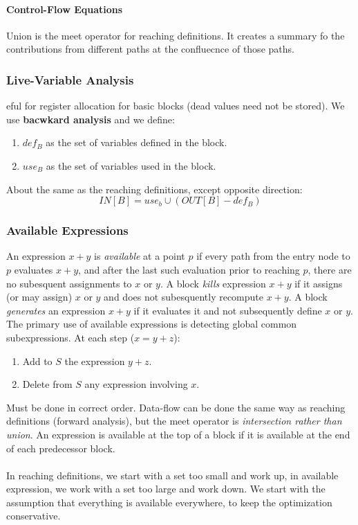 \documentclass{article}
\begin{document}
\paragraph{Control-Flow Equations} %
\label{par:Control-Flow Equations}
Union is the meet operator for reaching definitions. It creates a summary fo the contributions from different paths at the confluecnce of those paths.


\subsubsection{Live-Variable Analysis} %
\label{ssub:Live-Variable Analysis}
eful for register allocation for basic blocks (dead values need not be stored). We use \textbf{bacwkard analysis} and we define:
\begin{enumerate}
	\item $def_B$ as the set of variables defined in the block.
	\item $use_B$ as the set of variables used in the block.
\end{enumerate}
About the same as the reaching definitions, except opposite direction:
\begin{equation}
	IN[B] = use_b \cup (OUT[B] - def_B)
\end{equation}

\subsubsection{Available Expressions} %
\label{ssub:Availabel Expressions}
An expression $x + y$ is \emph{available} at a point $p$ if every path from the entry node to $p$ evaluates $x + y$, and after the last such evaluation prior to reaching $p$, there are no subesquent assignments to $x$ or $y$. A block \emph{kills} expression $x + y$ if it assigns (or may assign) $x$ or $y$ and does not subesquently recompute $x + y$. A block \emph{generates} an expression $x + y$ if it evaluates it and not subsequently define $x$ or $y$. The primary use of available expressions is detecting global common subexpressions. At each step ($x = y + z$):
\begin{enumerate}
	\item Add to $S$ the expression $y + z$.
	\item Delete from $S$ any expression involving $x$.
\end{enumerate}
Must be done in correct order. Data-flow can be done the same way as reaching definitions (forward analysis), but the meet operator is \emph{intersection rather than union}. An expression is available at the top of a block if it is available at the end of each predecessor block.\\
\\
In reaching definitions, we start with a set too small and work up, in available expression, we work with a set too large and work down. We start with the assumption that everything is available everywhere, to keep the optimization conservative.
\end{document}
